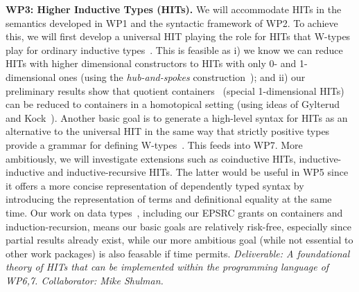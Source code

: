 \documentclass[a4paper,11pt]{article}
\begin{document}
{\bf WP3: Higher Inductive Types (HITs).}  We will accommodate HITs in
the semantics developed in WP1 and the syntactic framework of WP2. To
achieve this, we will first develop a universal HIT playing the role
for HITs that W-types play for ordinary inductive
types~\cite{alti:cont-tcs}. This is feasible as i) we know we can
reduce HITs with higher dimensional constructors to HITs with only 0-
and 1-dimensional ones (using the \emph{hub-and-spokes}
construction~\cite{hott-book}); and ii) our preliminary results show
that quotient containers~\cite{alti:mpc04} (special 1-dimensional
HITs) can be reduced to containers in a homotopical setting (using
ideas of Gylterud~\cite{gylterud:thesis} and
Kock~\cite{kock:groupoids}).  Another basic goal is to generate a
high-level syntax for HITs as an alternative to the universal HIT in
the same way that strictly positive types provide a grammar for
defining W-types~\cite{alti:cont-tcs}.  This feeds into WP7.  More
ambitiously, we will investigate extensions such as coinductive HITs,
inductive-inductive and inductive-recursive HITs. The latter would be
useful in WP5 since it offers a more concise representation of
dependently typed syntax by introducing the representation of terms
and definitional equality at the same time.  Our work on data
types~\cite{alti:cont-tcs,
  altenkirchGhaniHancockMcBrideMorris:indexedContainers,
  alti:catind2,ghani:fibredIR,GambinoN:polfpm,awodeyGamSoja:indTypesInHTT},
including our EPSRC grants on containers and induction-recursion,
means our basic goals are relatively risk-free, especially since
partial results already exist, while our more ambitious goal (while
not essential to other work packages) is also feasable if time
permits. {\em Deliverable: A foundational theory of HITs that 
  can be implemented within the programming language of WP6,7.
  Collaborator: Mike Shulman.  }
\end{document}
